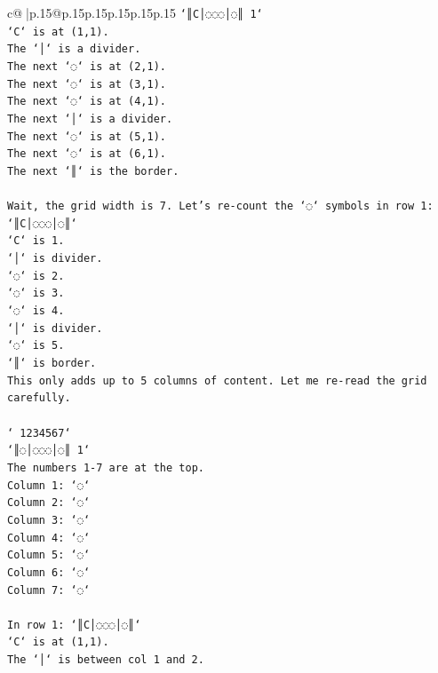 \documentclass{article}
\begin{document}
{\begin{supertabular}{c@{$\;$}|p{.15\linewidth}@{}p{.15\linewidth}p{.15\linewidth}p{.15\linewidth}p{.15\linewidth}p{.15\linewidth}}
{{{\texttt{`║C│◌◌◌│◌║ 1`} \\
\texttt{`C` is at (1,1).} \\
\texttt{The `│` is a divider.} \\
\texttt{The next `◌` is at (2,1).} \\
\texttt{The next `◌` is at (3,1).} \\
\texttt{The next `◌` is at (4,1).} \\
\texttt{The next `│` is a divider.} \\
\texttt{The next `◌` is at (5,1).} \\
\texttt{The next `◌` is at (6,1).} \\
\texttt{The next `║` is the border.} \\
\\ 
\texttt{Wait, the grid width is 7. Let's re{-}count the `◌` symbols in row 1:} \\
\texttt{`║C│◌◌◌│◌║`} \\
\texttt{`C` is 1.} \\
\texttt{`│` is divider.} \\
\texttt{`◌` is 2.} \\
\texttt{`◌` is 3.} \\
\texttt{`◌` is 4.} \\
\texttt{`│` is divider.} \\
\texttt{`◌` is 5.} \\
\texttt{`║` is border.} \\
\texttt{This only adds up to 5 columns of content. Let me re{-}read the grid carefully.} \\
\\ 
\texttt{` 1234567`} \\
\texttt{`║◌│◌◌◌│◌║ 1`} \\
\texttt{The numbers 1{-}7 are at the top.} \\
\texttt{Column 1: `◌`} \\
\texttt{Column 2: `◌`} \\
\texttt{Column 3: `◌`} \\
\texttt{Column 4: `◌`} \\
\texttt{Column 5: `◌`} \\
\texttt{Column 6: `◌`} \\
\texttt{Column 7: `◌`} \\
\\ 
\texttt{In row 1: `║C│◌◌◌│◌║`} \\
\texttt{`C` is at (1,1).} \\
\texttt{The `│` is between col 1 and 2.} \\
}}}
\end{supertabular}}
\end{document}
